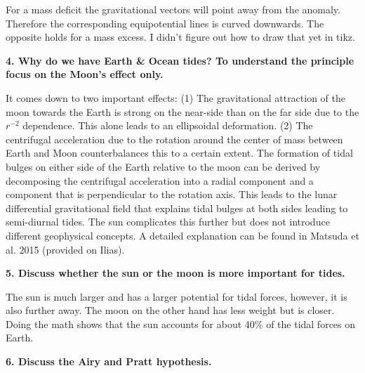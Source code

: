 \ifanswers
  \begin{tcolorbox}[enhanced jigsaw,breakable,pad at break*=1mm,
    colback=blue!5!white,colframe=babyblueeyes,title=Solutions]
  For a mass deficit the gravitational vectors will point away from the anomaly. Therefore the corresponding equipotential lines is curved downwards. The opposite holds for a mass excess. I didn't figure out how to draw that yet in tikz.
  \end{tcolorbox}
\fi
  \textbf{4. Why do we have Earth \& Ocean tides? To understand the principle focus on the Moon's effect only.}
  \ifanswers
    \begin{tcolorbox}[enhanced jigsaw,breakable,pad at break*=1mm,
      colback=blue!5!white,colframe=babyblueeyes,title=Solutions]
    It comes down to two important effects: (1) The gravitational attraction of the moon towards the Earth is strong on the near-side than on the far side due to the $r^{-2}$ dependence. This alone leads to an ellipsoidal deformation. (2) The centrifugal acceleration due to the rotation around the center of mass between Earth and Moon counterbalances this to a certain extent. The formation of tidal bulges on either side of the Earth relative to the moon can be derived by decomposing the centrifugal acceleration into a radial component and a component that is perpendicular to the rotation axis. This leads to the lunar differential gravitational field that explains tidal bulges at both sides leading to semi-diurnal tides. The sun complicates this further but does not introduce different geophysical concepts. A detailed explanation can be found in Matsuda et al. 2015 (provided on Ilias).
    \end{tcolorbox}
  \fi
    \textbf{5. Discuss whether the sun or the moon is more important for tides.}
  
    \ifanswers
      \begin{tcolorbox}[enhanced jigsaw,breakable,pad at break*=1mm,
        colback=blue!5!white,colframe=babyblueeyes,title=Solutions]
        The sun is much larger and has a larger potential for tidal forces, however, it is also further away. The moon on the other hand has less weight but is closer. Doing the math shows that the sun accounts for about 40\% of the tidal forces on Earth.
      \end{tcolorbox}
\fi
      \textbf{6. Discuss the Airy and Pratt hypothesis. }
